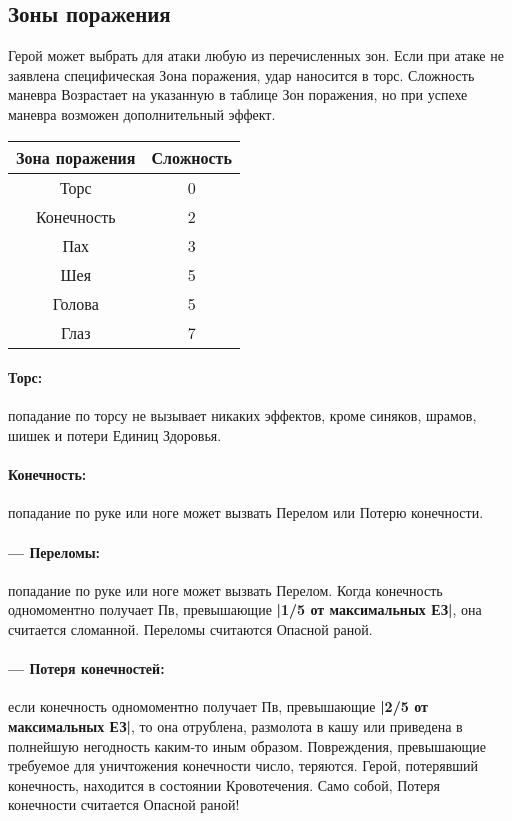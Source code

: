 \subsection{Зоны поражения}
Герой может выбрать для атаки любую из перечисленных зон. Если при атаке не заявлена специфическая Зона поражения, удар наносится в торс.
\newline Сложность маневра Возрастает на указанную в таблице Зон поражения, но при успехе маневра возможен дополнительный эффект.
\begin{center}
\begin{tabular}{|c|c|}
\hline
Зона поражения & Сложность \\ \hline
Торс & 0 \\ \hline
Конечность & 2 \\ \hline
Пах & 3 \\ \hline
Шея & 5 \\ \hline
Голова & 5 \\ \hline
Глаз & 7 \\ \hline
\end{tabular}
\end{center}
\paragraph{Торс:} попадание по торсу не вызывает никаких эффектов, кроме синяков, шрамов, шишек и потери Единиц Здоровья.
\paragraph{Конечность:} попадание по руке или ноге может вызвать Перелом или Потерю конечности.
\paragraph{— Переломы:} попадание по руке или ноге может вызвать Перелом. Когда конечность одномоментно получает Пв, превышающие \textbf{|1/5 от максимальных ЕЗ|}, она считается сломанной. Переломы считаются Опасной раной.
\paragraph{— Потеря конечностей:} если конечность одномоментно получает Пв, превышающие \textbf{|2/5 от максимальных ЕЗ|}, то она отрублена, размолота в кашу или приведена в полнейшую негодность каким-то иным образом. Повреждения, превышающие требуемое для уничтожения конечности число, теряются. Герой, потерявший конечность, находится в состоянии Кровотечения. Само собой, Потеря конечности считается Опасной раной!

